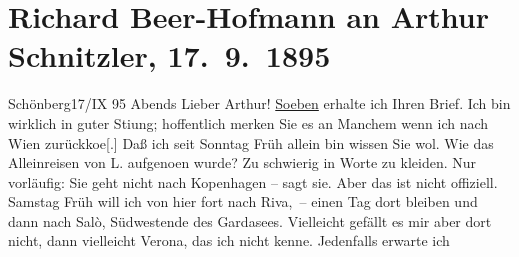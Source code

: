

         
         \newcommand{\erwaehntePersonen}{Personen: Lou Andreas-Salomé, Leo Ebermann, Johann Wolfgang von Goethe, Hugo von Hofmannsthal, Paul Horn, Felix Salten, Ludwig Speidel}
         \newcommand{\erwaehnteInstitutionen}{Institutionen: Bibliographisches Institut}
         \newcommand{\erwaehnteOrte}{Orte: Brenner, Gasthaus Jagerhof, Kopenhagen, Lago di Garda, Riva del Garda, Salò, Schönberg im Stubaital, Verona, Wien}
         \newcommand{\erwaehnteWerke}{Werke: Deutsche Alpen, Italienische Reise, Liebelei. Schauspiel in drei Akten, Meyers Reisebücher}
               \section[Richard Beer-Hofmann an Arthur Schnitzler, 17. 9. 1895]{ Richard Beer-Hofmann an Arthur Schnitzler, 17. 9. 1895}\nopagebreak{}\rehead{ }\begin{ledgroupsized}[t]{13cm}\normalsize\beginnumbering \toendnotes[C]{\smallbreak\pagebreak[2]} 
\toendnotes[C]{\smallbreak}\pstart
           \raggedleft{}{\pb}Schönberg17/IX 95{ }Abends\pend
           \pstart
           Lieber Arthur! \uline{Soeben} erhalte ich Ihren Brief. Ich bin wirklich in
               guter Sti{\geminationm}ung; hoffentlich merken Sie es an Manchem wenn
               ich nach Wien zurückko{\geminationm}e{[}.{]} Daß ich seit Sonntag{ }Früh allein bin wissen Sie wol. Wie das Alleinreisen von L. aufgeno{\geminationm}en wurde?
               Zu schwierig in Worte zu kleiden. Nur vorläufig: Sie geht nicht nach Kopenhagen – sagt sie. Aber das ist nicht offiziell. Samstag{ }\introOben{}Früh\introOben{} will ich von {\pb}hier fort nach
                  Riva, – einen Tag dort bleiben und dann nach Salò, Südwestende des Gardasees. Vielleicht gefällt es mir aber dort nicht, dann vielleicht Verona, das ich nicht kenne. Jedenfalls erwarte ich

\end{ledgroupsized}
